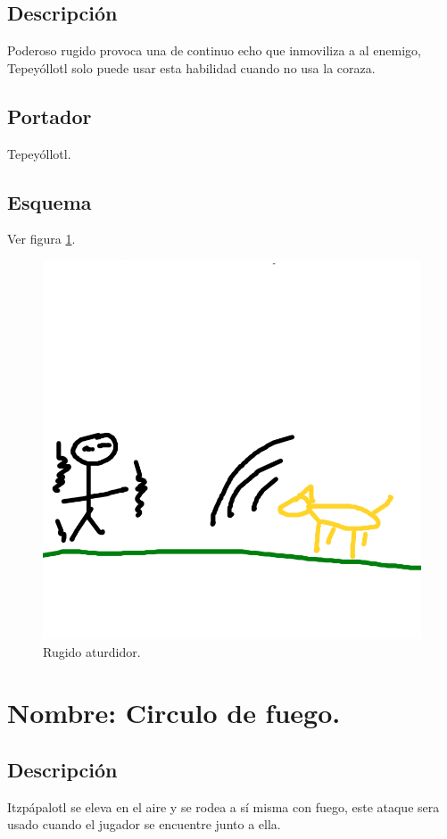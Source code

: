 \subsection{Descripción}
Poderoso rugido provoca una de continuo echo que inmoviliza a al enemigo, Tepeyóllotl solo puede usar esta habilidad cuando no usa la coraza. 
\subsection{Portador}
Tepeyóllotl. 
\subsection{Esquema}
			Ver figura \ref{fig:rugido}.
			\begin{figure}
				\centering
				\includegraphics[height=0.2 \textheight]{Imagenes/rugido}
				\caption{Rugido aturdidor.}
				\label{fig:rugido}
			\end{figure}
			
\section{Nombre: Circulo de fuego.} \label{hab.CirFue}
\subsection{Descripción}
Itzpápalotl se eleva en el aire y se rodea a sí misma con fuego, este ataque sera usado cuando el jugador se encuentre junto a ella.
